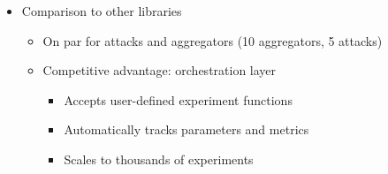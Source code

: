 \documentclass[twoside,11pt]{article}
\begin{document}
{\begin{itemize}
\begin{itemize}
\begin{itemize}
            \item Orchestration: accept user-defined experiment functions, track parameters and metrics
            \begin{itemize}
                \item Declare experiment parameters programmatically
                \item Collect typed metrics over time
                \item Produce pandas DataFrames from full parameter sweeps
                \item Automatically tracks all run parameters
                \item Enables managing thousands of experiments with full reproducibility
                \item Programmatic Python API rather than configuration files
            \end{itemize}
        \end{itemize}
        \item for the future: easy to extend, easy to customize
        \begin{itemize}
            \item Combine any aggregation rule with any attack within a simulation faithful to a specific paper
            \item Sweep over hyperparameters in a reproducible way
            \item New aggregation rules, attacks, or protocols without modifying the orchestration code
        \end{itemize}
        \item Well-documented: explicit reference to papers, tutorials
        \item Open-source: source code and tutorials at \url{https://github.com/calicarpa/krum}
    \end{itemize}
    \item Comparison to other libraries
    \begin{itemize}
        \item On par for attacks and aggregators (10 aggregators, 5 attacks)
        \item Competitive advantage: orchestration layer
        \begin{itemize}
            \item Accepts user-defined experiment functions
            \item Automatically tracks parameters and metrics
            \item Scales to thousands of experiments

\end{itemize}
\end{itemize}
\end{itemize}}
\end{document}
